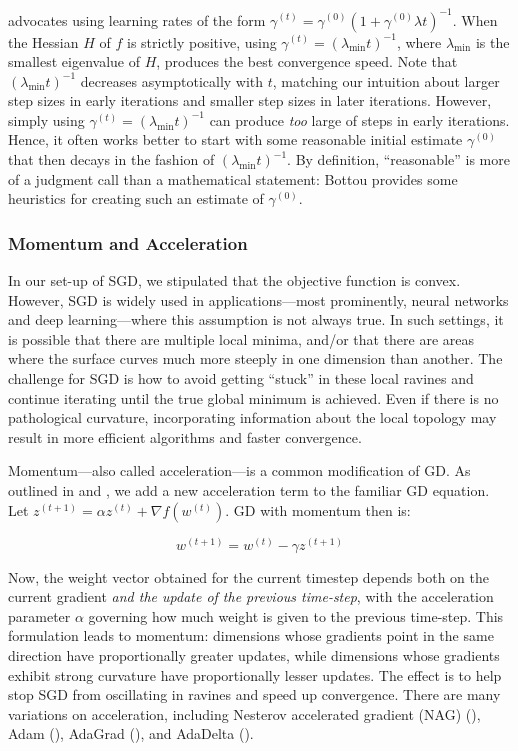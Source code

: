 \documentclass{article}
\begin{document}
\cite{bottou2012stochastic} advocates using learning rates of the form
$\gamma^{(t)} = \gamma^{(0)}(1 + \gamma^{(0)}\lambda t)^{-1}$. When the Hessian
$H$ of $f$ is strictly positive, using $\gamma^{(t)} =
(\lambda_{\mathrm{min}}t)^{-1}$, where $\lambda_{\mathrm{min}}$ is the smallest
eigenvalue of $H$, produces the best convergence speed. Note that $
(\lambda_{\mathrm{min}}t)^{-1}$ decreases asymptotically with $t$, matching our intuition
about larger step sizes in early iterations and smaller step sizes in later
iterations. However, simply using $\gamma^{(t)} =
(\lambda_{\mathrm{min}}t)^{-1}$ can produce \textit{too} large of steps in early
iterations. Hence, it often works better to start with some reasonable initial
estimate $\gamma^{(0)}$ that then decays in the fashion of
$(\lambda_{\mathrm{min}}t)^{-1}$. By definition, ``reasonable'' is more of a judgment
call than a mathematical statement: Bottou provides some heuristics for creating
such an estimate of $\gamma^{(0)}$.

\subsubsection{Momentum and Acceleration}

In our set-up of SGD, we stipulated that the objective function is
convex. However, SGD is widely used in applications---most prominently, neural
networks and deep
learning---where this assumption is not
always true. In such settings, it is
possible that there are multiple local minima, and/or that there are areas where
the surface curves much more steeply in one dimension than another. The challenge for SGD is
how to avoid getting ``stuck'' in these local ravines and continue iterating
until the true global minimum is achieved. Even if there is no pathological
curvature, incorporating information about the local topology may result in more
efficient algorithms and faster convergence.

Momentum---also called acceleration---is a common modification of GD. As outlined in
\cite{rumelhart1986general} and 
\cite{qian1999momentum}, we add a new acceleration term to the familiar GD
equation. Let $z^{(t+1)} = \alpha z^{(t)} + \nabla f(w^{(t)})$. GD with
momentum then is:

\begin{equation}
	w^{(t+1)} = w^{(t)} - \gamma z^{(t+1)}
\end{equation}

Now, the weight vector obtained for the current timestep depends both on the
current gradient \textit{and the update of the previous time-step}, with the
acceleration parameter $\alpha$ governing how much weight is given to the
previous time-step. 
This formulation leads to momentum: dimensions whose
gradients point in the same direction have proportionally greater updates, while
dimensions whose gradients exhibit strong curvature have proportionally
lesser updates. The effect is to help stop SGD from oscillating in ravines and
speed up convergence. There are many variations on acceleration, including
Nesterov accelerated gradient (NAG) (\cite{nesterov}), Adam
(\cite{kingma2014adam}), AdaGrad
(\cite{duchi2011adaptive}), and AdaDelta (\cite{zeiler2012adadelta}).
\end{document}
